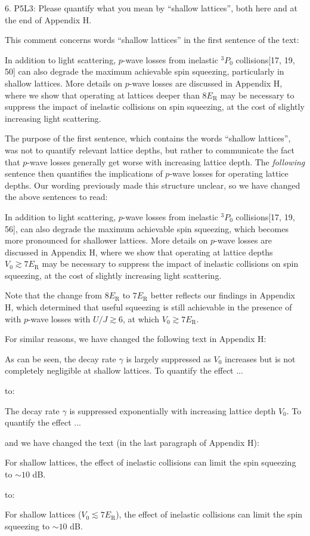 \documentclass[preprint,superscriptaddress]{revtex4-2}
\renewcommand{\t}{\text} %
\newcommand{\blue}[1]{{\color{blue} #1}}
\newcommand{\red}[1]{{\color{red} #1}}
\newcommand{\green}[1]{{\color{ForestGreen} #1}}
\begin{document}
\begin{enumerate}
  \blue{6. P5L3: Please quantify what you mean by ``shallow
    lattices'', both here and at the end of Appendix H.}

  This comment concerns words ``shallow lattices'' in the first
  sentence of the text:

  \red{In addition to light scattering, $p$-wave losses from inelastic
    ${}^3 P_0$ collisions[17, 19, 50] can also degrade the maximum
    achievable spin squeezing, particularly in shallow lattices.  More
    details on $p$-wave losses are discussed in Appendix H, where we
    show that operating at lattices deeper than $8 E_{\t{R}}$ may be
    necessary to suppress the impact of inelastic collisions on spin
    squeezing, at the cost of slightly increasing light scattering.}

  The purpose of the first sentence, which contains the words
  ``shallow lattices'', was not to quantify relevant lattice depths,
  but rather to communicate the fact that $p$-wave losses generally
  get worse with increasing lattice depth.  The {\it following}
  sentence then quantifies the implications of $p$-wave losses for
  operating lattice depths.  Our wording previously made this
  structure unclear, so we have changed the above sentences to read:

  \green{In addition to light scattering, $p$-wave losses from
    inelastic ${}^3 P_0$ collisions[17, 19, 56], can also degrade the
    maximum achievable spin squeezing, which becomes more pronounced
    for shallower lattices.  More details on $p$-wave losses are
    discussed in Appendix H, where we show that operating at lattice
    depths $V_0\gtrsim 7 E_{\t{R}}$ may be necessary to suppress the
    impact of inelastic collisions on spin squeezing, at the cost of
    slightly increasing light scattering.}

  Note that the change from \red{$8E_{\t{R}}$} to \green{$7E_{\t{R}}$}
  better reflects our findings in Appendix H, which determined that
  useful squeezing is still achievable in the presence of with
  $p$-wave losses with $U/J\gtrsim6$, at which $V_0\gtrsim7E_{\t{R}}$.

  For similar reasons, we have changed the following text in Appendix
  H:

  \red{As can be seen, the decay rate $\gamma$ is largely suppressed
    as $V_0$ increases but is not completely negligible at shallow
    lattices.  To quantify the effect ...}

  to:

  \green{The decay rate $\gamma$ is suppressed exponentially with
    increasing lattice depth $V_0$.  To quantify the effect ...}

  and we have changed the text (in the last paragraph of Appendix H):

  \red{For shallow lattices, the effect of inelastic collisions can
    limit the spin squeezing to $\sim10$ dB.}

  to:

  \green{For shallow lattices ($V_0\lesssim7E_{\t{R}}$), the effect of
    inelastic collisions can limit the spin squeezing to $\sim10$ dB.}

\end{enumerate}
\end{document}
